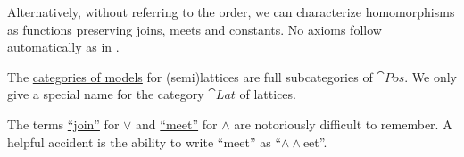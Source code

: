 \begin{definition}
\begin{thmenum}[resume=def:semilattice]
    Alternatively, without referring to the order, we can characterize homomorphisms as functions preserving joins, meets and constants. No axioms follow automatically as in .

     The \hyperref[def:category_of_first_order_models]{categories of models} for (semi)lattices are full subcategories of \hyperref[def:poset/category]{\( \cat{Pos} \)}. We only give a special name for the category \( \cat{Lat} \) of lattices.
  \end{thmenum}
\end{definition}

\begin{remark}\label{rem:lattice_operation_etymology}
  The terms \hyperref[thm:binary_lattice_operations/join]{\enquote{join}} for \( \vee \) and \hyperref[thm:binary_lattice_operations/meet]{\enquote{meet}} for \( \wedge \) are notoriously difficult to remember. A helpful accident is the ability to write \enquote{meet} as \enquote{\( \wedge \wedge \)eet}.
\end{remark}

